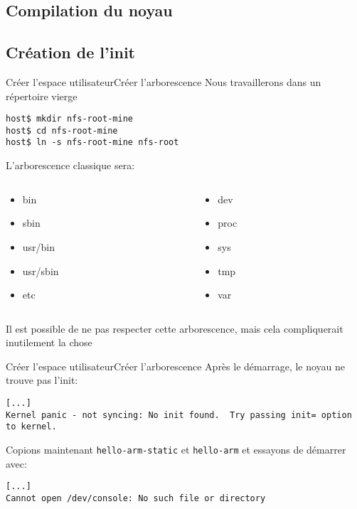 \subsection{Compilation du noyau}


\subsection{Création de l'init}


\begin{frame}[fragile=singleslide]{Créer l'espace utilisateur}{Créer l'arborescence}
  Nous travaillerons dans un répertoire vierge
  \begin{lstlisting}
host$ mkdir nfs-root-mine
host$ cd nfs-root-mine
host$ ln -s nfs-root-mine nfs-root
  \end{lstlisting} %
  L'arborescence classique sera:
  \vspace{-2ex}
  \begin{columns}[onlytextwidth,t]
    \begin{column}[t]{0.5\textwidth}
      \begin{itemize}
      \item bin
      \item sbin
      \item usr/bin
      \item usr/sbin
      \item etc
      \end{itemize}
    \end{column}
    \begin{column}[t]{0.5\textwidth}
      \begin{itemize}
      \item dev
      \item proc
      \item sys
      \item tmp
      \item var
      \end{itemize}
    \end{column}
  \end{columns}
  \vspace{2ex}
  Il est possible de ne pas respecter cette arborescence, mais cela
  compliquerait inutilement la chose
\end{frame}

\begin{frame}[fragile=singleslide]{Créer l'espace utilisateur}{Créer l'arborescence}
  Après le démarrage, le noyau ne trouve pas l'init:
    \begin{lstlisting}
[...]
Kernel panic - not syncing: No init found.  Try passing init= option to kernel.
    \end{lstlisting}

    Copions maintenant  \verb+hello-arm-static+ et \verb+hello-arm+ et
    essayons de démarrer avec:
    \begin{lstlisting}
[...]
Cannot open /dev/console: No such file or directory
    \end{lstlisting}
\end{frame}

